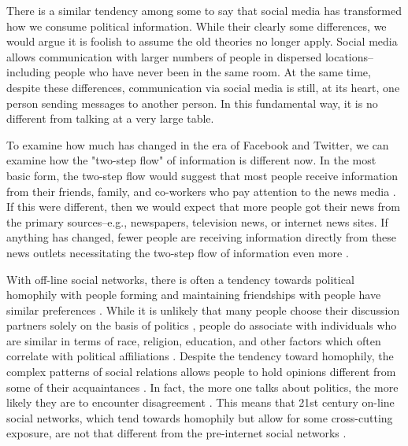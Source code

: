 \documentclass[12pt]{article}
\begin{document}
\begin{doublespace}
There is a similar tendency among some to say that social media has transformed how we consume political information. While their clearly some differences, we would argue it is foolish to assume the old theories no longer apply. Social media allows communication with larger numbers of people in dispersed locations--including people who have never been in the same room. At the same time, despite these differences, communication via social media is still, at its heart, one person sending messages to another person. In this fundamental way, it is no different from talking at a very large table.

To examine how much has changed in the era of Facebook and Twitter, we can examine how the "two-step flow" of information is different now. In the most basic form, the two-step flow would suggest that most people receive information from their friends, family, and co-workers who pay attention to the news media \citep{Katz1957}. If this were different, then we would expect that more people got their news from the primary sources--e.g., newspapers, television news, or internet news sites. If anything has changed, fewer people are receiving information directly from these news outlets necessitating the two-step flow of information even more \citep{Prior2005}.

With off-line social networks, there is often a tendency towards political homophily with people forming and maintaining friendships with people have similar preferences \citep{Finifter1974,NoelNyhan2011}.  While it is unlikely that many people choose their discussion partners solely on the basis of politics \citep{EvelandKleinman2013}, people do associate with individuals who are similar in terms of race, religion, education, and other factors which often correlate with political affiliations \citep{McPhersonSmithLovinCook2001}. Despite the tendency toward homophily, the complex patterns of social relations allows people to hold opinions different from some of their acquaintances \citep{HuckfeldtJohnsonSprague2004}. In fact, the more one talks about politics, the more likely they are to encounter disagreement \citep{HuckfeldtMendez2008}. This means that 21st century on-line social networks, which tend towards homophily but allow for some cross-cutting exposure, are not that different from the pre-internet social networks \citep{BakshyMessingAdamic2015,Barbera2015}.


\end{doublespace}
\end{document}

